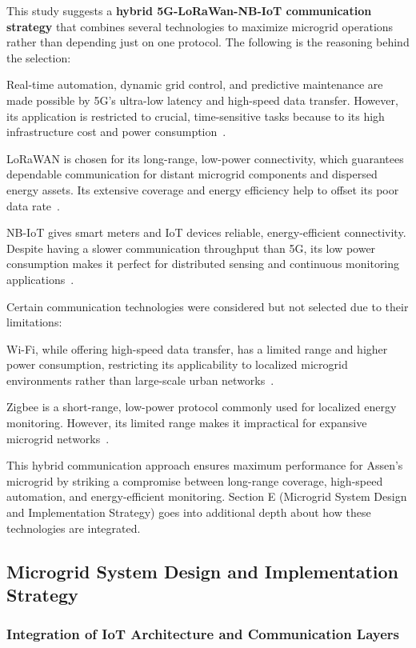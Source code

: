 \documentclass[conference]{IEEEtran}
\begin{document}
This study suggests a \textbf{hybrid 5G-LoRaWan-NB-IoT communication strategy} that combines several technologies to maximize microgrid operations rather than depending just on one protocol. The following is the reasoning behind the selection:

Real-time automation, dynamic grid control, and predictive maintenance are made possible by 5G's ultra-low latency and high-speed data transfer. However, its application is restricted to crucial, time-sensitive tasks because to its high infrastructure cost and power consumption~\cite{8752482}.  

LoRaWAN is chosen for its long-range, low-power connectivity, which guarantees dependable communication for distant microgrid components and dispersed energy assets. Its extensive coverage and energy efficiency help to offset its poor data rate~\cite{smartcities4020024}.  

NB-IoT gives smart meters and IoT devices reliable, energy-efficient connectivity. Despite having a slower communication throughput than 5G, its low power consumption makes it perfect for distributed sensing and continuous monitoring applications~\cite{9023471}.  

Certain communication technologies were considered but not selected due to their limitations: 

Wi-Fi, while offering high-speed data transfer, has a limited range and higher power consumption, restricting its applicability to localized microgrid environments rather than large-scale urban networks~\cite{10474733}.

Zigbee is a short-range, low-power protocol commonly used for localized energy monitoring. However, its limited range makes it impractical for expansive microgrid networks~\cite{8458217}.    

This hybrid communication approach ensures maximum performance for Assen's microgrid by striking a compromise between long-range coverage, high-speed automation, and energy-efficient monitoring. Section E (Microgrid System Design and Implementation Strategy) goes into additional depth about how these technologies are integrated. 

\subsection{Microgrid System Design and Implementation Strategy}

\subsubsection{Integration of IoT Architecture and Communication Layers}
\end{document}
